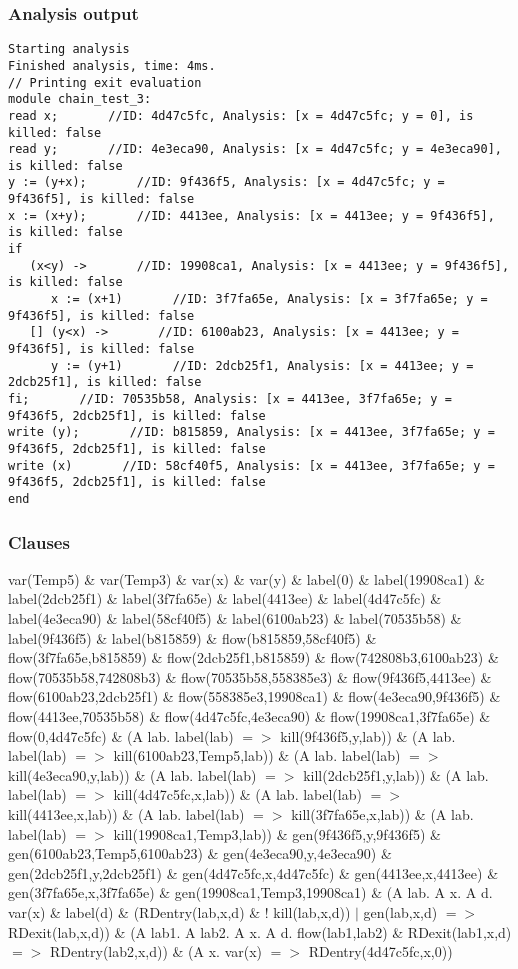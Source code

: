 \documentclass{report}
\begin{document}
\subsubsection{Analysis output}
\begin{lstlisting}
Starting analysis
Finished analysis, time: 4ms.
// Printing exit evaluation
module chain_test_3:
read x;       //ID: 4d47c5fc, Analysis: [x = 4d47c5fc; y = 0], is killed: false
read y;       //ID: 4e3eca90, Analysis: [x = 4d47c5fc; y = 4e3eca90], is killed: false
y := (y+x);       //ID: 9f436f5, Analysis: [x = 4d47c5fc; y = 9f436f5], is killed: false
x := (x+y);       //ID: 4413ee, Analysis: [x = 4413ee; y = 9f436f5], is killed: false
if
   (x<y) ->       //ID: 19908ca1, Analysis: [x = 4413ee; y = 9f436f5], is killed: false
      x := (x+1)       //ID: 3f7fa65e, Analysis: [x = 3f7fa65e; y = 9f436f5], is killed: false
   [] (y<x) ->       //ID: 6100ab23, Analysis: [x = 4413ee; y = 9f436f5], is killed: false
      y := (y+1)       //ID: 2dcb25f1, Analysis: [x = 4413ee; y = 2dcb25f1], is killed: false
fi;       //ID: 70535b58, Analysis: [x = 4413ee, 3f7fa65e; y = 9f436f5, 2dcb25f1], is killed: false
write (y);       //ID: b815859, Analysis: [x = 4413ee, 3f7fa65e; y = 9f436f5, 2dcb25f1], is killed: false
write (x)       //ID: 58cf40f5, Analysis: [x = 4413ee, 3f7fa65e; y = 9f436f5, 2dcb25f1], is killed: false
end
\end{lstlisting}
\subsubsection{Clauses}
var(Temp5) \& var(Temp3) \& var(x) \& var(y) \& 
label(0) \& label(19908ca1) \& label(2dcb25f1) \& label(3f7fa65e) \& label(4413ee) \& label(4d47c5fc) \& label(4e3eca90) \& label(58cf40f5) \& label(6100ab23) \& label(70535b58) \& label(9f436f5) \& label(b815859) \& 
flow(b815859,58cf40f5) \& flow(3f7fa65e,b815859) \& flow(2dcb25f1,b815859) \& flow(742808b3,6100ab23) \& flow(70535b58,742808b3) \& flow(70535b58,558385e3) \& flow(9f436f5,4413ee) \& flow(6100ab23,2dcb25f1) \& flow(558385e3,19908ca1) \& flow(4e3eca90,9f436f5) \& flow(4413ee,70535b58) \& flow(4d47c5fc,4e3eca90) \& flow(19908ca1,3f7fa65e) \& flow(0,4d47c5fc) \& 
(A lab. label(lab) $=>$ kill(9f436f5,y,lab)) \& (A lab. label(lab) $=>$ kill(6100ab23,Temp5,lab)) \& (A lab. label(lab) $=>$ kill(4e3eca90,y,lab)) \& (A lab. label(lab) $=>$ kill(2dcb25f1,y,lab)) \& (A lab. label(lab) $=>$ kill(4d47c5fc,x,lab)) \& (A lab. label(lab) $=>$ kill(4413ee,x,lab)) \& (A lab. label(lab) $=>$ kill(3f7fa65e,x,lab)) \& (A lab. label(lab) $=>$ kill(19908ca1,Temp3,lab)) \& 
gen(9f436f5,y,9f436f5) \& gen(6100ab23,Temp5,6100ab23) \& gen(4e3eca90,y,4e3eca90) \& gen(2dcb25f1,y,2dcb25f1) \& gen(4d47c5fc,x,4d47c5fc) \& gen(4413ee,x,4413ee) \& gen(3f7fa65e,x,3f7fa65e) \& gen(19908ca1,Temp3,19908ca1) \& 
(A lab. A x. A d. var(x) \& label(d) \& (RDentry(lab,x,d) \& ! kill(lab,x,d)) $|$ gen(lab,x,d) $=>$ RDexit(lab,x,d)) \& 
(A lab1. A lab2. A x. A d. flow(lab1,lab2) \& RDexit(lab1,x,d) $=>$ RDentry(lab2,x,d)) \& 
(A x. var(x) $=>$ RDentry(4d47c5fc,x,0))
\end{document}
